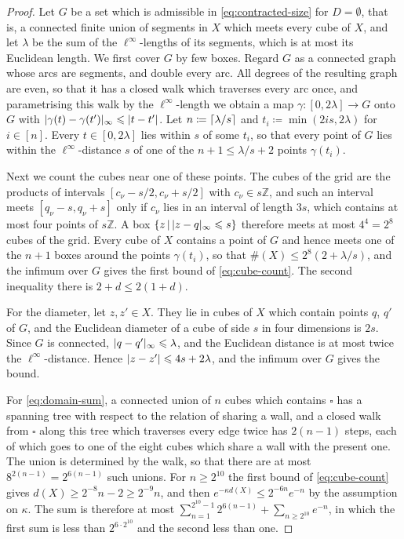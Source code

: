\documentclass[11pt]{preprint}
\DeclarePairedDelimiter{\abs}{\lvert}{\rvert}
\DeclarePairedDelimiter{\ceil}{\lceil}{\rceil}
\numberwithin{equation}{section}
\begin{document}
\begin{proof}
Let $G$ be a set which is admissible in \eqref{eq:contracted-size} for $D = \emptyset$, that is, a connected finite union of segments in $X$ which meets every cube of $X$, and let $\lambda$ be the sum of the $\ell^\infty$-lengths of its segments, which is at most its Euclidean length. We first cover $G$ by few boxes. Regard $G$ as a connected graph whose arcs are segments, and double every arc. All degrees of the resulting graph are even, so that it has a closed walk which traverses every arc once, and parametrising this walk by the $\ell^\infty$-length we obtain a map $\gamma \colon [0, 2\lambda] \to G$ onto $G$ with $\abs{\gamma(t) - \gamma(t')}_\infty \leqslant \abs{t - t'}$. Let $n \coloneqq \ceil{\lambda/s}$ and $t_i \coloneqq \min(2is, 2\lambda)$ for $i \in [n]$. Every $t \in [0, 2\lambda]$ lies within $s$ of some $t_i$, so that every point of $G$ lies within the $\ell^\infty$-distance $s$ of one of the $n + 1 \leqslant \lambda/s + 2$ points $\gamma(t_i)$.

Next we count the cubes near one of these points. The cubes of the grid are the products of intervals $[c_\nu - s/2, c_\nu + s/2]$ with $c_\nu \in s\mathbb Z$, and such an interval meets $[q_\nu - s, q_\nu + s]$ only if $c_\nu$ lies in an interval of length $3s$, which contains at most four points of $s\mathbb Z$. A box $\{ z \,|\, \abs{z - q}_\infty \leqslant s \}$ therefore meets at most $4^4 = 2^8$ cubes of the grid. Every cube of $X$ contains a point of $G$ and hence meets one of the $n + 1$ boxes around the points $\gamma(t_i)$, so that $\#(X) \leqslant 2^8(2 + \lambda/s)$, and the infimum over $G$ gives the first bound of \eqref{eq:cube-count}. The second inequality there is $2 + d \leqslant 2(1 + d)$.

For the diameter, let $z, z' \in X$. They lie in cubes of $X$ which contain points $q$, $q'$ of $G$, and the Euclidean diameter of a cube of side $s$ in four dimensions is $2s$. Since $G$ is connected, $\abs{q - q'}_\infty \leqslant \lambda$, and the Euclidean distance is at most twice the $\ell^\infty$-distance. Hence $\abs{z - z'} \leqslant 4s + 2\lambda$, and the infimum over $G$ gives the bound.

For \eqref{eq:domain-sum}, a connected union of $n$ cubes which contains $\square$ has a spanning tree with respect to the relation of sharing a wall, and a closed walk from $\square$ along this tree which traverses every edge twice has $2(n - 1)$ steps, each of which goes to one of the eight cubes which share a wall with the present one. The union is determined by the walk, so that there are at most $8^{2(n-1)} = 2^{6(n-1)}$ such unions. For $n \geqslant 2^{10}$ the first bound of \eqref{eq:cube-count} gives $d(X) \geqslant 2^{-8}n - 2 \geqslant 2^{-9}n$, and then $e^{-\kappa d(X)} \leqslant 2^{-6n}e^{-n}$ by the assumption on $\kappa$. The sum is therefore at most $\sum_{n=1}^{2^{10}-1}2^{6(n-1)} + \sum_{n \geqslant 2^{10}}e^{-n}$, in which the first sum is less than $2^{6 \cdot 2^{10}}$ and the second less than one.
\end{proof}
\end{document}
